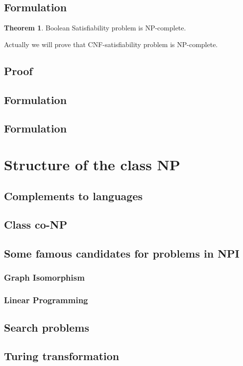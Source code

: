 \documentclass{article}
\theoremstyle{definition}
\newtheorem{theorem}{Theorem}[section]
\begin{document}
\subsection{Formulation}
\begin{theorem}
    Boolean Satisfiability problem is NP-complete.
\end{theorem}
Actually we will prove that CNF-satisfiability problem is NP-complete.

\subsection{Proof}
\subsection{Formulation}
\subsection{Formulation}


\pagebreak
\section{Structure of the class NP}
\subsection{Complements to languages}
\subsection{Class co-NP}
\subsection{Some famous candidates for problems in NPI}
\subsubsection{Graph Isomorphism}
\subsubsection{Linear Programming}
\subsection{Search problems}
\subsection{Turing transformation}
\end{document}
